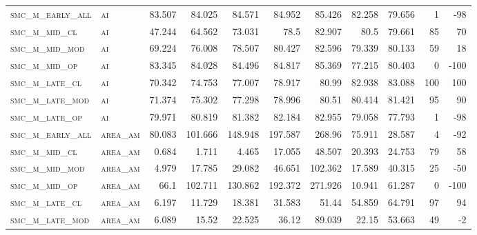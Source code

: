 \begin{landscape}
\begin{center}
\begin{footnotesize}
\begin{longtable}{llrrrrrr|rrr}
\hline \hline
\endlastfoot

\textsc{smc\_m\_early\_all} & \textsc{ai        }   & 83.507   & 84.025   & 84.571   & 84.952   & 85.426   & 82.258      & 79.656        & 1             & -98      \\
\textsc{smc\_m\_mid\_cl   } & \textsc{ai        }   & 47.244   & 64.562   & 73.031   & 78.5     & 82.907   & 80.5        & 79.661        & 85            & 70       \\
\textsc{smc\_m\_mid\_mod  } & \textsc{ai        }   & 69.224   & 76.008   & 78.507   & 80.427   & 82.596   & 79.339      & 80.133        & 59            & 18       \\
\textsc{smc\_m\_mid\_op   } & \textsc{ai        }   & 83.345   & 84.028   & 84.496   & 84.817   & 85.369   & 77.215      & 80.403        & 0             & -100     \\
\textsc{smc\_m\_late\_cl  } & \textsc{ai        }   & 70.342   & 74.753   & 77.007   & 78.917   & 80.99    & 82.938      & 83.088        & 100           & 100      \\
\textsc{smc\_m\_late\_mod } & \textsc{ai        }   & 71.374   & 75.302   & 77.298   & 78.996   & 80.51    & 80.414      & 81.421        & 95            & 90       \\
\textsc{smc\_m\_late\_op  } & \textsc{ai        }   & 79.971   & 80.819   & 81.382   & 82.184   & 82.955   & 79.058      & 77.793        & 1             & -98      \\
\textsc{smc\_m\_early\_all} & \textsc{area\_am  }   & 80.083   & 101.666  & 148.948  & 197.587  & 268.96   & 75.911      & 28.587        & 4             & -92      \\
\textsc{smc\_m\_mid\_cl   } & \textsc{area\_am  }   & 0.684    & 1.711    & 4.465    & 17.055   & 48.507   & 20.393      & 24.753        & 79            & 58       \\
\textsc{smc\_m\_mid\_mod  } & \textsc{area\_am  }   & 4.979    & 17.785   & 29.082   & 46.651   & 102.362  & 17.589      & 40.315        & 25            & -50      \\
\textsc{smc\_m\_mid\_op   } & \textsc{area\_am  }   & 66.1     & 102.711  & 130.862  & 192.372  & 271.926  & 10.941      & 61.287        & 0             & -100     \\
\textsc{smc\_m\_late\_cl  } & \textsc{area\_am  }   & 6.197    & 11.729   & 18.381   & 31.583   & 51.44    & 54.859      & 64.791        & 97            & 94       \\
\textsc{smc\_m\_late\_mod } & \textsc{area\_am  }   & 6.089    & 15.52    & 22.525   & 36.12    & 89.039   & 22.15       & 53.663        & 49            & -2       \\

\end{longtable}
\end{footnotesize}
\end{center}
\end{landscape}
